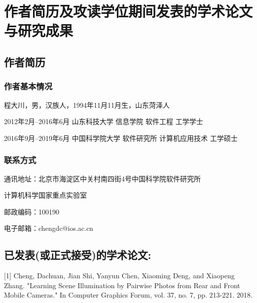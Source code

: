 \chapter{作者简历及攻读学位期间发表的学术论文与研究成果}

\section*{作者简历}

\subsection*{作者基本情况}
程大川，男，汉族人，1994年11月11月生，山东菏泽人

2012年2月--2016年6月 山东科技大学 信息学院 软件工程 工学学士

2016年9月--2019年6月 中国科学院大学 软件研究所 计算机应用技术 工学硕士

\subsection*{联系方式}
通讯地址：北京市海淀区中关村南四街4号中国科学院软件研究所

计算机科学国家重点实验室

邮政编码：100190

电子邮箱：chengdc@ios.ac.cn 

\section*{已发表(或正式接受)的学术论文:}

[1] Cheng, Dachuan, Jian Shi, Yanyun Chen, Xiaoming Deng, and Xiaopeng Zhang. "Learning Scene Illumination by Pairwise Photos from Rear and Front Mobile Cameras." In Computer Graphics Forum, vol. 37, no. 7, pp. 213-221. 2018.



